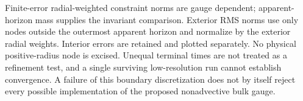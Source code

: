 \documentclass[11pt]{article}
\begin{document}
Finite-error radial-weighted constraint norms are gauge dependent; apparent-horizon mass supplies the invariant comparison. Exterior RMS norms use only nodes outside the outermost apparent horizon and normalize by the exterior radial weights. Interior errors are retained and plotted separately. No physical positive-radius node is excised. Unequal terminal times are not treated as a refinement test, and a single surviving low-resolution run cannot establish convergence. A failure of this boundary discretization does not by itself reject every possible implementation of the proposed nonadvective bulk gauge.
\end{document}

